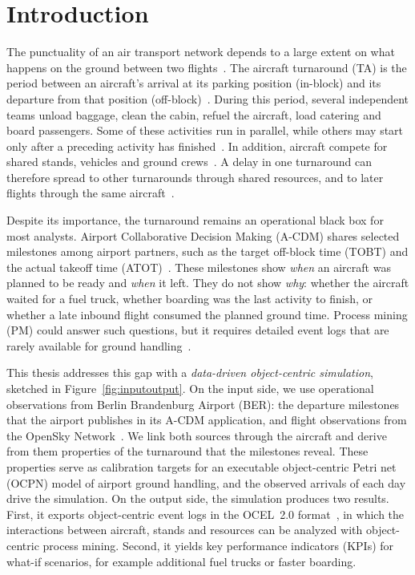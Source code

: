 \chapter{Introduction}
\label{ch:intro}

The punctuality of an air transport network depends to a large extent on what happens on the ground between two flights~\cite{schultz2012dynamic,evler2021recovery}. The aircraft turnaround (TA) is the period between an aircraft's arrival at its parking position (in-block) and its departure from that position (off-block)~\cite{eurocontrol_acdm}. During this period, several independent teams unload baggage, clean the cabin, refuel the aircraft, load catering and board passengers. Some of these activities run in parallel, while others may start only after a preceding activity has finished~\cite{schultz2012dynamic,sng2019petri}. In addition, aircraft compete for shared stands, vehicles and ground crews~\cite{padron2019scheduling}. A delay in one turnaround can therefore spread to other turnarounds through shared resources, and to later flights through the same aircraft~\cite{evler2021recovery}.

Despite its importance, the turnaround remains an operational black box for most analysts. Airport Collaborative Decision Making (A-CDM) shares selected milestones among airport partners, such as the target off-block time (TOBT) and the actual takeoff time (ATOT)~\cite{eurocontrol_acdm}. These milestones show \emph{when} an aircraft was planned to be ready and \emph{when} it left. They do not show \emph{why}: whether the aircraft waited for a fuel truck, whether boarding was the last activity to finish, or whether a late inbound flight consumed the planned ground time. Process mining (PM) could answer such questions, but it requires detailed event logs that are rarely available for ground handling~\cite{tkacenko2026}.

This thesis addresses this gap with a \emph{data-driven object-centric simulation}, sketched in Figure~\ref{fig:inputoutput}. On the input side, we use operational observations from Berlin Brandenburg Airport (BER): the departure milestones that the airport publishes in its A-CDM application, and flight observations from the OpenSky Network~\cite{opensky_rest}. We link both sources through the aircraft and derive from them properties of the turnaround that the milestones reveal. These properties serve as calibration targets for an executable object-centric Petri net (OCPN) model of airport ground handling, and the observed arrivals of each day drive the simulation. On the output side, the simulation produces two results. First, it exports object-centric event logs in the OCEL~2.0 format~\cite{koren2024ocel2,ocel2}, in which the interactions between aircraft, stands and resources can be analyzed with object-centric process mining. Second, it yields key performance indicators (KPIs) for what-if scenarios, for example additional fuel trucks or faster boarding.

